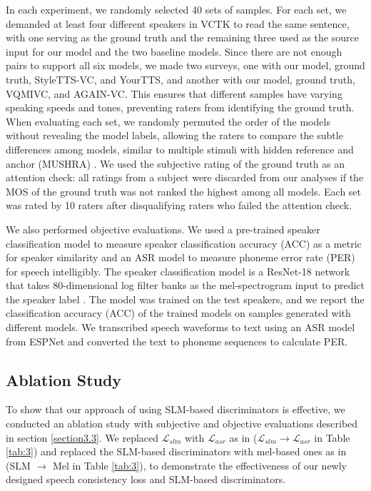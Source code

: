 \documentclass{article}
\begin{document}
\begin{sloppy}
In each experiment, we randomly selected 40 sets of samples. For each set, we demanded at least four different speakers in VCTK to read the same sentence, with one serving as the ground truth and the remaining three used as the source input for our model and the two baseline models. Since there are not enough pairs to support all six models, we made two surveys, one with our model, ground truth, StyleTTS-VC, and YourTTS, and another with our model, ground truth, VQMIVC, and AGAIN-VC. This ensures that different samples have varying speaking speeds and tones, preventing raters from identifying the ground truth. When evaluating each set, we randomly permuted the order of the models without revealing the model labels, allowing the raters to compare the subtle differences among models, similar to multiple stimuli with hidden reference and anchor (MUSHRA)  \cite{li2022styletts}. We used the subjective rating of the ground truth as an attention check: all ratings from a subject were discarded from our analyses if the MOS of the ground truth was not ranked the highest among all models. Each set was rated by 10 raters after disqualifying raters who failed the attention check.

We also performed objective evaluations. We used a pre-trained speaker classification model to measure speaker classification accuracy (ACC) as a metric for speaker similarity and an ASR model to measure phoneme error rate (PER) for speech intelligibly. The speaker classification model is a ResNet-18 network that takes 80-dimensional log filter banks as the mel-spectrogram input to predict the speaker label \cite{li2023styletts}. The model was trained on the test speakers, and we report the classification accuracy (ACC) of the trained models on samples generated with different models. We transcribed speech waveforms to text using an ASR model from ESPNet \cite{watanabe2018espnet} and converted the text to phoneme sequences to calculate PER.

\subsection{Ablation Study}
\label{section3.4}
To show that our approach of using SLM-based discriminators is effective, we conducted an ablation study with subjective and objective evaluations described in section \ref{section3.3}. We replaced $\mathcal{L}_{slm}$ with $\mathcal{L}_{asr}$ as in \cite{li2021starganv2} ($\mathcal{L}_{slm} \rightarrow \mathcal{L}_{asr}$ in Table \ref{tab:3}) and replaced the SLM-based discriminators with mel-based ones as in \cite{li2021starganv2} (SLM $\rightarrow$ Mel in Table \ref{tab:3}), to demonstrate the effectiveness of our newly designed speech consistency loss and SLM-based discriminators. 


\end{sloppy}
\end{document}
